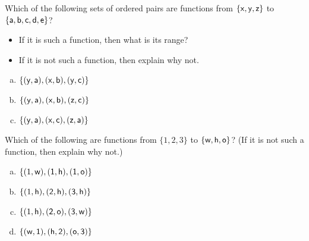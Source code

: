 \begin{exercise}{16}
 Which of the following sets of ordered pairs are functions from
$\{\sf{x}, \sf{y}, \sf{z}\}$ to $\{\sf{a},\sf{b},\sf{c},\sf{d},\sf{e}\}$? 
\begin{itemize}
\item If it is such a function, then what is its range? 
\item If it is not such a function, then explain why not.
\end{itemize}
\begin{enumerate}[(a)]
\item \label{FunctionsChapExers-Whichxy-yaxbyc}
$\{(\sf{y}, \sf{a}), (\sf{x}, \sf{b}), (\sf{y},\sf{c})\}$
\item \label{FunctionsChapExers-Whichxy-yaxbzc}
$\{(\sf{y}, \sf{a}), (\sf{x},\sf{b}), (\sf{z},\sf{c})\}$
\item \label{FunctionsChapExers-Whichxy-yaxcza}
$\{(\sf{y}, \sf{a}), (\sf{x},\sf{c}), (\sf{z},\sf{a})\}$
\end{enumerate}
\end{exercise}

\begin{exercise}{}
 Which of the following are functions from
$\{1, 2, 3\}$ to $\{\sf{w},\sf{h},\sf{o}\}$?
(If it is not such a function, then explain why not.)
\begin{multicols}{2}
\begin{enumerate}[(a)]
\item \label{FunctionsChapExers-Which123-1w1h1o}
$\{(1, \sf{w}), (1, \sf{h}), (1,\sf{o})\}$
\item \label{FunctionsChapExers-Which123-1h2h3h}
$\{(1, \sf{h}), (2,\sf{h}), (3,\sf{h})\}$
\item \label{FunctionsChapExers-Which123-1h2o3w}
$\{(1, \sf{h}), (2,\sf{o}), (3,\sf{w})\}$
\item \label{FunctionsChapExers-Which123-w1h2o3}
$\{(\sf{w},1), (\sf{h},2), (\sf{o},3)\}$
\end{enumerate}
\end{multicols}
\end{exercise}

